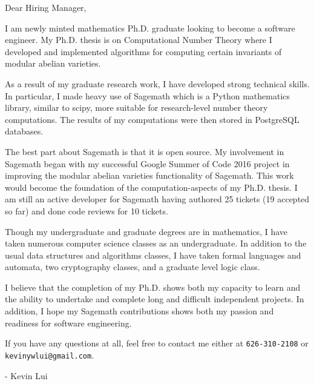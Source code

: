 \documentclass{letter}
\begin{document}
\begin{letter}

    \opening{Dear Hiring Manager,}

    I am newly minted mathematics Ph.D. graduate looking to become a software
    engineer. My Ph.D. thesis is on Computational Number Theory where I
    developed and implemented algorithms for computing certain invariants of
    modular abelian varieties.

    As a result of my graduate research work, I have developed strong technical
    skills. In particular, I made heavy use of Sagemath which is a Python
    mathematics library, similar to scipy, more suitable for research-level
    number theory computations. The results of my computations were then stored
    in PostgreSQL databases.

    The best part about Sagemath is that it is open source. My involvement in
    Sagemath began with my successful Google Summer of Code 2016 project in
    improving the modular abelian varieties functionality of Sagemath. This
    work would become the foundation of the computation-aspects of my Ph.D.
    thesis. I am still an active developer for Sagemath having authored 25
    tickets (19 accepted so far) and done code reviews for 10 tickets.

    Though my undergraduate and graduate degrees are in mathematics, I have
    taken numerous computer science classes as an undergraduate. In addition to
    the usual data structures and algorithms classes, I have taken formal
    languages and automata, two cryptography classes, and a graduate level
    logic class.

    I believe that the completion of my Ph.D. shows both my capacity to learn
    and the ability to undertake and complete long and difficult independent
    projects. In addition, I hope my Sagemath contributions shows both my
    passion and readiness for software engineering.

    If you have any questions at all, feel free to contact me either at
    \verb+626-310-2108+ or \verb+kevinywlui@gmail.com+.

    \closing{- Kevin Lui}

\end{letter}
\end{document}
